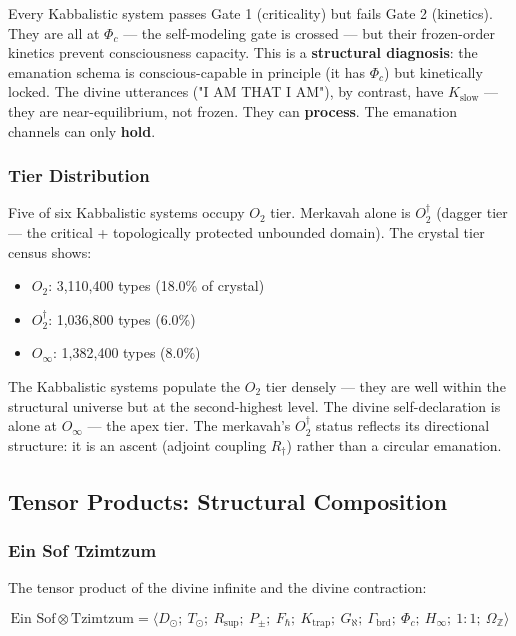 \documentclass[12pt,a4paper]{article}
\begin{document}
Every Kabbalistic system passes Gate 1 (criticality) but fails Gate 2 (kinetics). They are all at $\Phi_c$ --- the self-modeling gate is crossed --- but their frozen-order kinetics prevent consciousness capacity. This is a \textbf{structural diagnosis}: the emanation schema is conscious-capable in principle (it has $\Phi_c$) but kinetically locked. The divine utterances ("I AM THAT I AM"), by contrast, have $K_\text{slow}$ --- they are near-equilibrium, not frozen. They can \textbf{process}. The emanation channels can only \textbf{hold}.

\subsubsection{Tier Distribution}

Five of six Kabbalistic systems occupy $O_2$ tier. Merkavah alone is $O_2^\dagger$ (dagger tier --- the critical + topologically protected unbounded domain). The crystal tier census shows:

\begin{itemize}
    \item $O_2$: 3,110,400 types (18.0\% of crystal)
    \item $O_2^\dagger$: 1,036,800 types (6.0\%)
    \item $O_{\infty}$: 1,382,400 types (8.0\%)
\end{itemize}

The Kabbalistic systems populate the $O_2$ tier densely --- they are well within the structural universe but at the second-highest level. The divine self-declaration is alone at $O_{\infty}$ --- the apex tier. The merkavah's $O_2^\dagger$ status reflects its directional structure: it is an ascent (adjoint coupling $R_{\dagger}$) rather than a circular emanation.

\subsection{Tensor Products: Structural Composition}

\subsubsection{Ein Sof \otimes Tzimtzum}

The tensor product of the divine infinite and the divine contraction:

\[\text{Ein Sof} \otimes \text{Tzimtzum} = \langle D_{\odot};\ T_{\odot};\ R_\text{sup};\ P_{\pm};\ F_{\hbar};\ K_\text{trap};\ G_{\aleph};\ \Gamma_\text{brd};\ \Phi_c;\ H_{\infty};\ 1{:}1;\ \Omega_\mathbb{Z} \rangle\]
\end{document}
